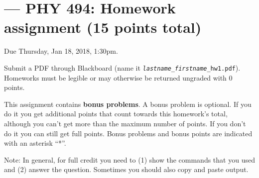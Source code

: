 \documentclass[letterpaper]{scrartcl}
\newcommand{\anumber}{1}
\begin{document}

\setcounter{section}{\anumber}
\addtocounter{section}{-1}
\section{ --- PHY 494: Homework assignment (15 points total)}

\noindent Due Thursday, Jan 18, 2018, 1:30pm.

\noindent Submit a PDF through Blackboard (name it
\texttt{\emph{lastname}\_\emph{firstname}\_hw\anumber.pdf}).
Homeworks must be legible or may otherwise be returned ungraded with 0
points.

This assignment contains \textbf{bonus problems}. A bonus problem is
optional. If you do it you get additional points that count towards
this homework's total, although you can't get more than the maximum
number of points. If you don't do it you can still get full
points. Bonus problems and bonus points are indicated with an asterisk
``*''.

Note: In general, for full credit you need to (1) show the commands
that you used and (2) answer the question. Sometimes you should also
copy and paste output.
\end{document}

